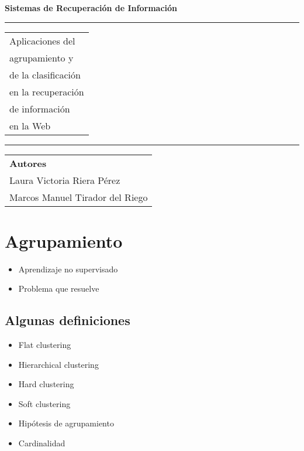 \documentclass{llncs}
\begin{document}
\thispagestyle{empty}
\begin{flushleft}
\LARGE\bfseries Sistemas de Recuperaci\'on de Informaci\'on\\[2cm]
\end{flushleft}
\rule{\textwidth}{1pt}
\vspace{2pt}
\begin{flushright}
\Huge
\begin{tabular}{@{}l}
Aplicaciones del\\
agrupamiento y\\ 
de la clasificación\\ 
en la recuperaci\'on\\ 
de informaci\'on\\
en la Web\\[6pt]
\end{tabular}
\end{flushright}
\rule{\textwidth}{1pt}
\vfill
\begin{flushleft}
\large\itshape
\begin{tabular}{@{}l}
{\large\upshape\bfseries Autores}\\[8pt]
Laura Victoria Riera P\'erez\\[5pt]
Marcos Manuel Tirador del Riego
\end{tabular}
\end{flushleft}

%
\newpage
{}
\tableofcontents
\thispagestyle{empty}

\newpage
{}

\section{Agrupamiento}

\begin{itemize}
\item Aprendizaje no supervisado

\item Problema que resuelve
\end{itemize}

\subsection{Algunas definiciones}

\begin{itemize}
\item Flat clustering

\item Hierarchical clustering

\item Hard clustering

\item Soft clustering

\item Hip\'otesis de agrupamiento

\item Cardinalidad
\end{itemize}
\end{document}

